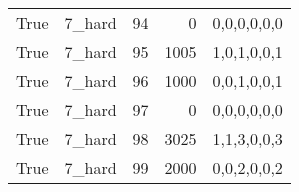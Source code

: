 \begin{tabular}{llrrl}
 True            & 7\_hard              &            94 &                     0 & 0,0,0,0,0,0   \\
 True            & 7\_hard              &            95 &                  1005 & 1,0,1,0,0,1   \\
 True            & 7\_hard              &            96 &                  1000 & 0,0,1,0,0,1   \\
 True            & 7\_hard              &            97 &                     0 & 0,0,0,0,0,0   \\
 True            & 7\_hard              &            98 &                  3025 & 1,1,3,0,0,3   \\
 True            & 7\_hard              &            99 &                  2000 & 0,0,2,0,0,2   \\
\hline
\end{tabular}